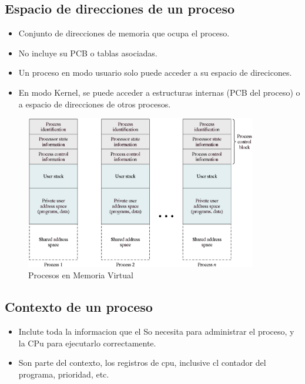 \subsection{Espacio de direcciones de un proceso}
\begin{itemize}
    \item Conjunto de direcciones de memoria que ocupa el proceso.
    \item No incluye su PCB o tablas asociadas.
    \item Un proceso en modo usuario solo puede acceder a su espacio de direcicones.
    \item En modo Kernel, se puede acceder a estructuras internas (PCB del proceso) o a espacio de direcciones de otros procesos.
\end{itemize}
\begin{figure}[ht]
    \begin{center}
        \includegraphics[width=0.90\textwidth]{assets/Proceso.eps}
    \end{center}
    \caption{Procesos en Memoria Virtual}\label{fig:1}
\end{figure}
\pagebreak

\subsection{Contexto de un proceso}
\begin{itemize}
    \item Inclute toda la informacion que el So necesita para administrar el proceso, y la CPu para ejecutarlo correctamente.
    \item Son parte del contexto, los registros de cpu, inclusive cl contador del programa, prioridad, etc.
\end{itemize}
